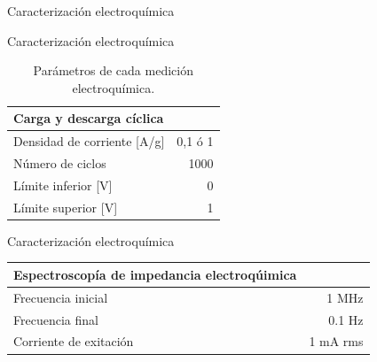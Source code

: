 \documentclass{beamer}
\begin{document}
	\begin{frame}[fragile]{Caracterización electroquímica}
		\begin{figure}
		\end{figure}
	\end{frame}

	\begin{frame}{Caracterización electroquímica}
\begin{table}[h!]
	\centering
	\begin{tabular}{ l r }
		Carga y descarga cíclica & \\
		\hline
		Densidad de corriente [A/g] & 0,1 ó 	1 \\
		Número de ciclos & 1000 \\
		Límite inferior [V] & 0 \\
		Límite superior [V] & 1 \\
	\end{tabular}
	\label{tab:elec_config}
	\caption[Parámetros de cada medición electroquímica]{Parámetros de cada medición electroquímica.}
\end{table}
\end{frame}

	\begin{frame}{Caracterización electroquímica}
\begin{table}[h!]
	\centering
	\begin{tabular}{ l r }
		Espectroscopía de impedancia electroqúimica & \\
		\hline
		Frecuencia inicial	&	1 MHz \\
		Frecuencia final	&	0.1 Hz \\
		Corriente de exitación & 1 mA rms \\ 
	\end{tabular}
\end{table}
\end{frame}
\end{document}
